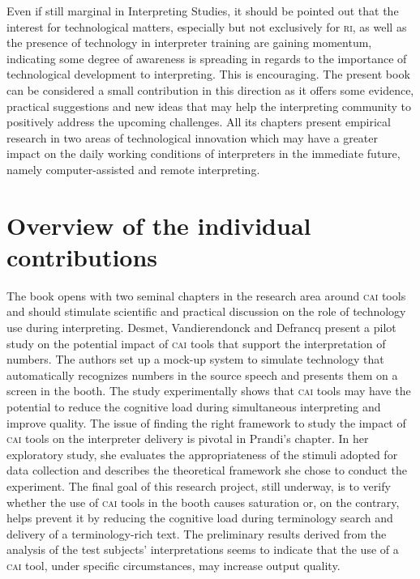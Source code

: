 \documentclass[output=paper]{langsci/langscibook}
\begin{document}
Even if still marginal in Interpreting Studies, it should be pointed out that the interest for technological matters, especially but not exclusively for \textsc{ri}, as well as the presence of technology in interpreter training are gaining momentum, indicating some degree of awareness is spreading in regards to the importance of technological development to interpreting. This is encouraging. The present book can be considered a small contribution in this direction as it offers some evidence, practical suggestions and new ideas that may help the interpreting community to positively address the upcoming challenges. All its chapters present empirical research in two areas of technological innovation which may have a greater impact on the daily working conditions of interpreters in the immediate future, namely computer-assisted and remote interpreting. 
 
\section{Overview of the individual contributions} 
 
The book opens with two seminal chapters in the research area around \textsc{cai} tools and should stimulate scientific and practical discussion on the role of technology use during interpreting. Desmet, Vandierendonck and Defrancq present a pilot study on the potential impact of \textsc{cai} tools that support the interpretation of numbers. The authors set up a mock-up system to simulate technology that automatically recognizes numbers in the source speech and presents them on a screen in the booth. The study experimentally shows that \textsc{cai} tools may have the potential to reduce the cognitive load during simultaneous interpreting and improve quality. The issue of finding the right framework to study the impact of \textsc{cai} tools on the interpreter delivery is pivotal in Prandi’s chapter. In her exploratory study, she evaluates the appropriateness of the stimuli adopted for data collection and describes the theoretical framework she chose to conduct the experiment. The final goal of this research project, still underway, is to verify whether the use of \textsc{cai} tools in the booth causes saturation or, on the contrary, helps prevent it by reducing the cognitive load during terminology search and delivery of a terminology-rich text. The preliminary results derived from the analysis of the test subjects’ interpretations seems to indicate that the use of a \textsc{cai} tool, under specific circumstances, may increase output quality. 
 
\end{document}
